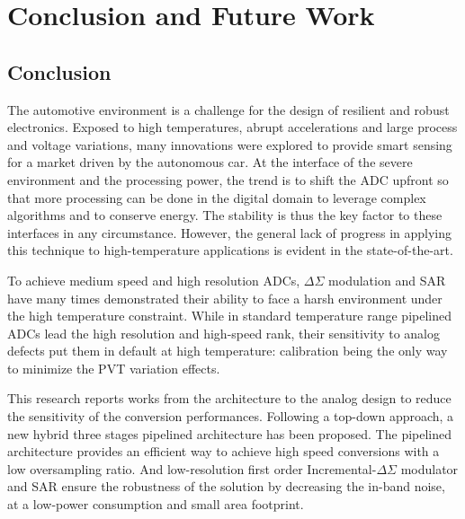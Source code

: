 \chapter{Conclusion and Future Work}
\label{sec:perspectives}
\ifpdf
    \graphicspath{{Chapter6/Figs/Raster/}{Chapter6/Figs/PDF/}{Chapter6/Figs/}}
\else
    \graphicspath{{Chapter6/Figs/Vector/}{Chapter6/Figs/}}
\fi

\section{Conclusion}           %
The automotive environment is a challenge for the design of resilient and robust electronics. Exposed to high temperatures, abrupt accelerations and large process and voltage variations, many innovations were explored to provide smart sensing for a market driven by the autonomous car. At the interface of the severe environment and the processing power, the trend is to shift the ADC upfront so that more processing can be done in the digital domain to leverage complex algorithms and to conserve energy. The stability is thus the key factor to these interfaces in any circumstance. However, the general lack of progress in applying this technique to high-temperature applications is evident in the state-of-the-art.

To achieve medium speed and high resolution ADCs, \(\Delta \Sigma \) modulation and SAR have many times demonstrated their ability to face a harsh environment under the high temperature constraint. While in standard temperature range pipelined ADCs lead the high resolution and high-speed rank, their sensitivity to analog defects put them in default at high temperature: calibration being the only way to minimize the PVT variation effects.

This research reports works from the architecture to the analog design to reduce the sensitivity of the conversion performances. Following a top-down approach, a new hybrid three stages pipelined architecture has been proposed. The pipelined architecture provides an efficient way to achieve high speed conversions with a low oversampling ratio. And low-resolution first order Incremental-\(\Delta \Sigma \) modulator and SAR ensure the robustness of the solution by decreasing the in-band noise, at a low-power consumption and small area footprint.

